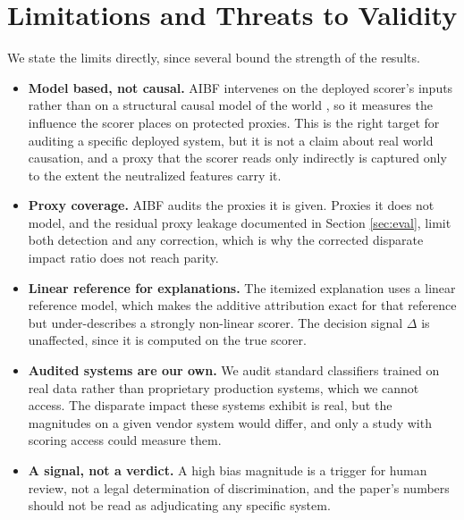 \documentclass[conference]{IEEEtran}
\begin{document}
\section{Limitations and Threats to Validity}
\label{sec:limits}
We state the limits directly, since several bound the strength of the results.

\begin{itemize}
\item \textbf{Model based, not causal.} AIBF intervenes on the deployed scorer's
inputs rather than on a structural causal model of the world \cite{kusner}, so it
measures the influence the scorer places on protected proxies. This is the right
target for auditing a specific deployed system, but it is not a claim about real world
causation, and a proxy that the scorer reads only indirectly is captured only to the
extent the neutralized features carry it.
\item \textbf{Proxy coverage.} AIBF audits the proxies it is given. Proxies it does
not model, and the residual proxy leakage documented in Section \ref{sec:eval}, limit
both detection and any correction, which is why the corrected disparate impact ratio
does not reach parity.
\item \textbf{Linear reference for explanations.} The itemized explanation uses a
linear reference model, which makes the additive attribution exact for that reference
but under-describes a strongly non-linear scorer. The decision signal $\Delta$ is
unaffected, since it is computed on the true scorer.
\item \textbf{Audited systems are our own.} We audit standard classifiers trained on
real data rather than proprietary production systems, which we cannot access. The
disparate impact these systems exhibit is real, but the magnitudes on a given vendor
system would differ, and only a study with scoring access could measure them.
\item \textbf{A signal, not a verdict.} A high bias magnitude is a trigger for human
review, not a legal determination of discrimination, and the paper's numbers should
not be read as adjudicating any specific system.
\end{itemize}
\end{document}

